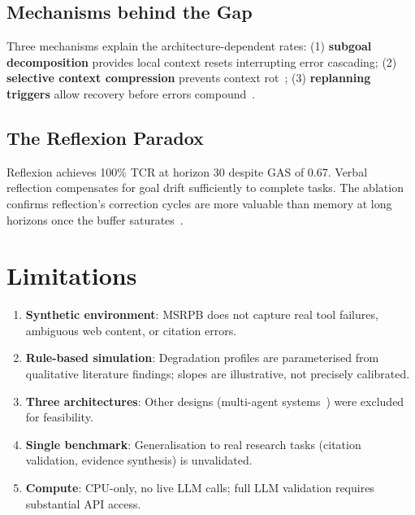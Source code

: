 \documentclass[conference]{IEEEtran}
\begin{document}
\subsection{Mechanisms behind the Gap}

Three mechanisms explain the architecture-dependent rates: (1)
\textbf{subgoal decomposition} provides local context resets interrupting error
cascading; (2) \textbf{selective context compression} prevents context
rot~\cite{liu2026context,wan2026compass}; (3) \textbf{replanning triggers}
allow recovery before errors compound~\cite{aghzal2026hierarchical,yao2026arc}.

\subsection{The Reflexion Paradox}

Reflexion achieves 100\% TCR at horizon 30 despite GAS of 0.67. Verbal
reflection compensates for goal drift sufficiently to complete tasks. The
ablation confirms reflection's correction cycles are more valuable than memory
at long horizons once the buffer saturates~\cite{shinn2023reflexion}.

\section{Limitations}
\label{sec:limitations}

\begin{enumerate}
  \item \textbf{Synthetic environment}: MSRPB does not capture real tool
        failures, ambiguous web content, or citation errors.
  \item \textbf{Rule-based simulation}: Degradation profiles are parameterised
        from qualitative literature findings; slopes are illustrative, not
        precisely calibrated.
  \item \textbf{Three architectures}: Other designs (multi-agent
        systems~\cite{lu2024aiscientist}) were excluded for feasibility.
  \item \textbf{Single benchmark}: Generalisation to real research tasks
        (citation validation, evidence synthesis) is unvalidated.
  \item \textbf{Compute}: CPU-only, no live LLM calls; full LLM validation
        requires substantial API access.
\end{enumerate}

\end{document}
